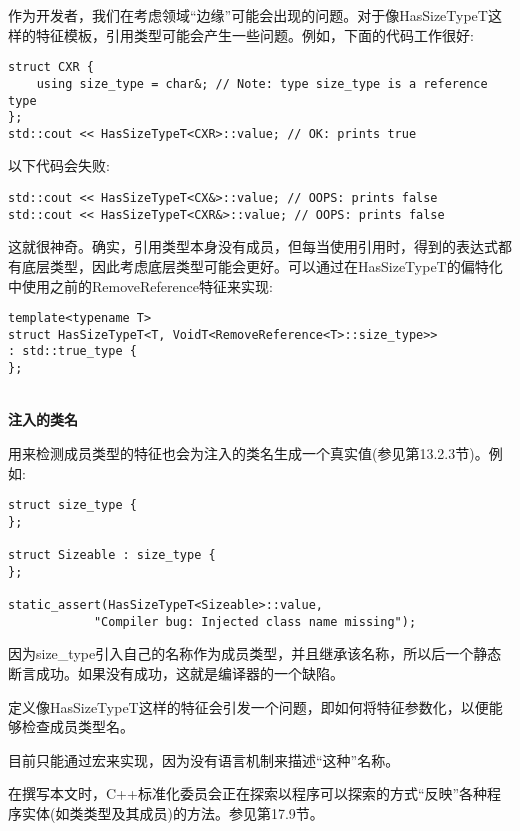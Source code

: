 作为开发者，我们在考虑领域“边缘”可能会出现的问题。对于像HasSizeTypeT这样的特征模板，引用类型可能会产生一些问题。例如，下面的代码工作很好:

\begin{lstlisting}[style=styleCXX]
struct CXR {
	using size_type = char&; // Note: type size_type is a reference type
};
std::cout << HasSizeTypeT<CXR>::value; // OK: prints true
\end{lstlisting}

以下代码会失败:

\begin{lstlisting}[style=styleCXX]
std::cout << HasSizeTypeT<CX&>::value; // OOPS: prints false
std::cout << HasSizeTypeT<CXR&>::value; // OOPS: prints false
\end{lstlisting}

这就很神奇。确实，引用类型本身没有成员，但每当使用引用时，得到的表达式都有底层类型，因此考虑底层类型可能会更好。可以通过在HasSizeTypeT的偏特化中使用之前的RemoveReference特征来实现:

\begin{lstlisting}[style=styleCXX]
template<typename T>
struct HasSizeTypeT<T, VoidT<RemoveReference<T>::size_type>>
: std::true_type {
};
\end{lstlisting}

\hspace*{\fill} \\ %
\noindent
\textbf{注入的类名}

用来检测成员类型的特征也会为注入的类名生成一个真实值(参见第13.2.3节)。例如:

\begin{lstlisting}[style=styleCXX]
struct size_type {
};

struct Sizeable : size_type {
};

static_assert(HasSizeTypeT<Sizeable>::value,
			"Compiler bug: Injected class name missing");
\end{lstlisting}

因为size\_type引入自己的名称作为成员类型，并且继承该名称，所以后一个静态断言成功。如果没有成功，这就是编译器的一个缺陷。


定义像HasSizeTypeT这样的特征会引发一个问题，即如何将特征参数化，以便能够检查成员类型名。

目前只能通过宏来实现，因为没有语言机制来描述“这种”名称。

\begin{tcolorbox}[colback=webgreen!5!white,colframe=webgreen!75!black]
\hspace*{0.75cm}在撰写本文时，C++标准化委员会正在探索以程序可以探索的方式“反映”各种程序实体(如类类型及其成员)的方法。参见第17.9节。
\end{tcolorbox}

